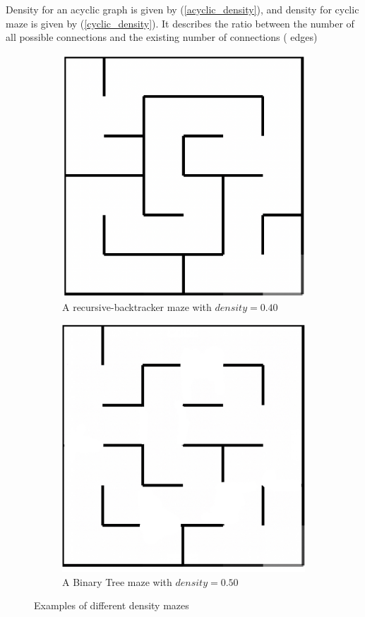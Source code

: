 \begin{description}[style=unboxed]
\item[Density] Density for an acyclic graph is given by (\ref{acyclic_density}), and density for cyclic maze is given by (\ref{cyclic_density})\cite{SBorg}. It describes the ratio between the number of all possible connections and the existing number of connections ( edges)
\begin{figure}[!h]
\centering
\begin{subfigure}{.5\textwidth}
\centering
\includegraphics[width=.5\linewidth]{recursivedens}
\caption{A recursive-backtracker maze with $density = 0.40$}
\label{fig:sub1}
\end{subfigure}%
\begin{subfigure}{.5\textwidth}
\centering
\includegraphics[width=.5\linewidth]{recursivedensecyclic}
\caption{A Binary Tree maze with $density = 0.50$}
\label{fig:sub2}
\end{subfigure}
\caption{Examples of different density mazes}
\label{fig:test}
\end{figure}
\end{description}
\newpage
